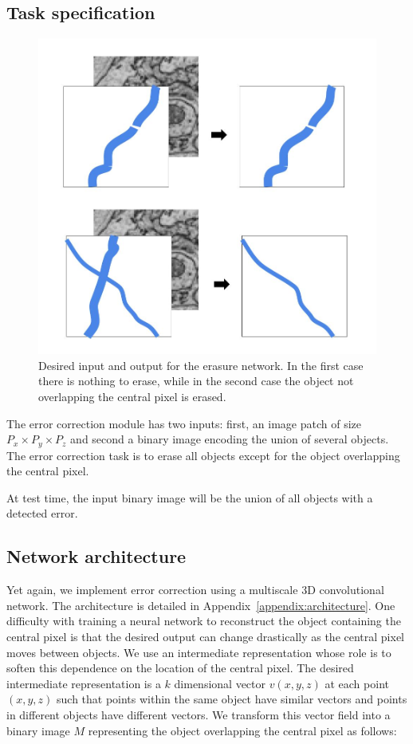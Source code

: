 \documentclass{article}
\begin{document}
\subsection{Task specification}
\begin{figure}
\begin{center}
	\includegraphics[width=0.65\linewidth]{correction_task.jpg}
	\caption{Desired input and output for the erasure network. In the first case there is nothing to erase, while in the second case the object not overlapping the central pixel is erased.}
	\label{fig:error_correction_cartoon}
\end{center}
\end{figure}
The error correction module has two inputs: first, an image patch of size $P_x\times P_y\times P_z$ and second a binary image encoding the union of several objects. The error correction task is to erase all objects except for the object overlapping the central pixel.

At test time, the input binary image will be the union of all objects with a detected error.

\subsection{Network architecture}
Yet again, we implement error correction using a multiscale 3D convolutional network. The architecture is detailed in Appendix~\ref{appendix:architecture}. One difficulty with training a neural network to reconstruct the object containing the central pixel is that the desired output can change drastically as the central pixel moves between objects. We use an intermediate representation whose role is to soften this dependence on the location of the central pixel. The desired intermediate representation is a $k$ dimensional vector $v(x,y,z)$ at each point $(x,y,z)$ such that points within the same object have similar vectors and points in different objects have different vectors. We transform this vector field into a binary image $M$ representing the object overlapping the central pixel as follows:
\end{document}
